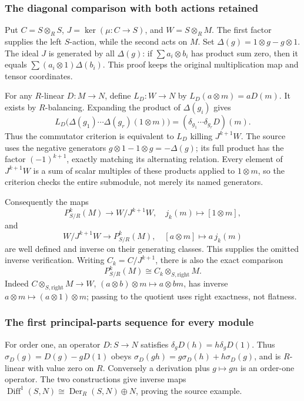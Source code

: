 \subsubsection{The diagonal comparison with both actions retained}\label{algebra-proof-043-the-diagonal-comparison-with-both-actions-retained}

Put \(C=S\otimes_R S\), \(J=\ker(\mu:C\to S)\), and \(W=S\otimes_R M\). The first factor supplies the left \(S\)-action, while the second acts on \(M\). Set \(\Delta(g)=1\otimes g-g\otimes1\). The ideal \(J\) is generated by all \(\Delta(g)\): if \(\sum a_i\otimes b_i\) has product sum zero, then it equals \(\sum(a_i\otimes1)\Delta(b_i)\). This proof keeps the original multiplication map and tensor coordinates.

For any \(R\)-linear \(D:M\to N\), define \(L_D:W\to N\) by \(L_D(a\otimes m)=aD(m)\). It exists by \(R\)-balancing. Expanding the product of \(\Delta(g_i)\) gives \[
L_D\bigl(\Delta(g_1)\cdots\Delta(g_r)(1\otimes m)\bigr)
=(\delta_{g_1}\cdots\delta_{g_r}D)(m).
\] Thus the commutator criterion is equivalent to \(L_D\) killing \(J^{k+1}W\). The source uses the negative generators \(g\otimes1-1\otimes g=-\Delta(g)\); its full product has the factor \((-1)^{k+1}\), exactly matching its alternating relation. Every element of \(J^{k+1}W\) is a sum of scalar multiples of these products applied to \(1\otimes m\), so the criterion checks the entire submodule, not merely its named generators.

Consequently the maps \[
P^k_{S/R}(M)\longrightarrow W/J^{k+1}W,\quad j_k(m)\longmapsto[1\otimes m],
\] and \[
W/J^{k+1}W\longrightarrow P^k_{S/R}(M),\quad[a\otimes m]\longmapsto a\,j_k(m)
\] are well defined and inverse on their generating classes. This supplies the omitted inverse verification. Writing \(C_k=C/J^{k+1}\), there is also the exact comparison \[
P^k_{S/R}(M)\cong C_k\otimes_{S,\mathrm{right}}M.
\] Indeed \(C\otimes_{S,\mathrm{right}}M\to W\), \((a\otimes b)\otimes m\mapsto a\otimes bm\), has inverse \(a\otimes m\mapsto(a\otimes1)\otimes m\); passing to the quotient uses right exactness, not flatness.

\subsubsection{The first principal-parts sequence for every module}\label{algebra-proof-043-the-first-principal-parts-sequence-for-every-module}

For order one, an operator \(D:S\to N\) satisfies \(\delta_gD(h)=h\delta_gD(1)\). Thus \(\sigma_D(g)=D(g)-gD(1)\) obeys \(\sigma_D(gh)=g\sigma_D(h)+h\sigma_D(g)\), and is \(R\)-linear with value zero on \(R\). Conversely a derivation plus \(g\mapsto gn\) is an order-one operator. The two constructions give inverse maps \(\operatorname{Diff}^1(S,N)\cong\operatorname{Der}_R(S,N)\oplus N\), proving the source example.

